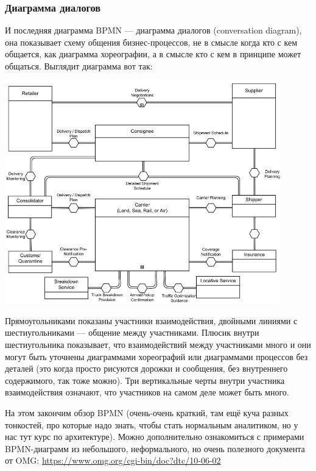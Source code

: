 \documentclass{../../text-style}
\begin{document}
\subsubsection{Диаграмма диалогов}

И последняя диаграмма BPMN --- диаграмма диалогов (conversation diagram), она показывает схему общения бизнес-процессов, не в смысле когда кто с кем общается, как диаграмма хореографии, а в смысле кто с кем в принципе может общаться. Выглядит диаграмма вот так:

\begin{center}
    \includegraphics[width=0.9\textwidth]{bpmnConversation.png}
\end{center}

Прямоугольниками показаны участники взаимодействия, двойными линиями с шестиугольниками --- общение между участниками. Плюсик внутри шестиугольника показывает, что взаимодействий между участниками много и они могут быть уточнены диаграммами хореографий или диаграммами процессов без деталей (это когда просто рисуются дорожки и сообщения, без внутреннего содержимого, так тоже можно). Три вертикальные черты внутри участника взаимодействия означают, что участников на самом деле может быть много.

На этом закончим обзор BPMN (очень-очень краткий, там ещё куча разных тонкостей, про которые надо знать, чтобы стать нормальным аналитиком, но у нас тут курс по архитектуре). Можно дополнительно ознакомиться с примерами BPMN-диаграмм из небольшого, неформального, но очень полезного документа от OMG: \url{https://www.omg.org/cgi-bin/doc?dtc/10-06-02}
\end{document}
